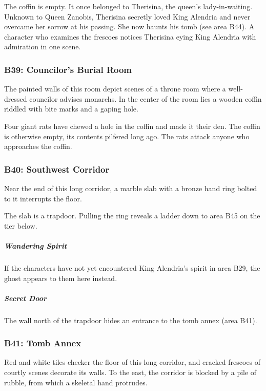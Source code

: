\documentclass[10pt,a4paper,twoside,bg=print,twocolumn,openany,nodeprecatedcode]{dndbook}
\begin{document}
The coffin is empty. It once belonged to Therisina, the queen's lady-in-waiting. Unknown to Queen Zanobis, Therisina secretly loved King Alendria and never overcame her sorrow at his passing. She now haunts his tomb (see area B44). A character who examines the frescoes notices Therisina eying King Alendria with admiration in one scene.

\subsubsection{B39: Councilor's Burial Room}
\begin{DndReadAloud}{}
The painted walls of this room depict scenes of a throne room where a well-dressed councilor advises monarchs. In the center of the room lies a wooden coffin riddled with bite marks and a gaping hole.

\end{DndReadAloud}

Four giant rats have chewed a hole in the coffin and made it their den. The coffin is otherwise empty, its contents pilfered long ago. The rats attack anyone who approaches the coffin.

\subsubsection{B40: Southwest Corridor}
\begin{DndReadAloud}{}
Near the end of this long corridor, a marble slab with a bronze hand ring bolted to it interrupts the floor.

\end{DndReadAloud}

The slab is a trapdoor. Pulling the ring reveals a ladder down to area B45 on the tier below.

\subparagraph{Wandering Spirit}
If the characters have not yet encountered King Alendria's spirit in area B29, the ghost appears to them here instead.

\subparagraph{Secret Door}
The wall north of the trapdoor hides an entrance to the tomb annex (area B41).

\subsubsection{B41: Tomb Annex}
\begin{DndReadAloud}{}
Red and white tiles checker the floor of this long corridor, and cracked frescoes of courtly scenes decorate its walls. To the east, the corridor is blocked by a pile of rubble, from which a skeletal hand protrudes.

\end{DndReadAloud}
\end{document}
